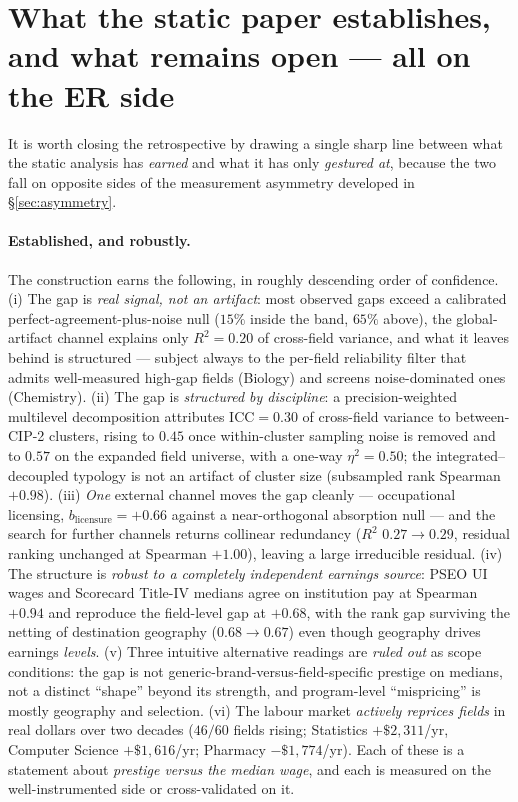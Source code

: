 \documentclass[11pt]{article}
\begin{document}
\section{What the static paper establishes, and what remains open --- all on the ER side}\label{sec:closing}

It is worth closing the retrospective by drawing a single sharp line between what the static analysis has
\emph{earned} and what it has only \emph{gestured at}, because the two fall on opposite sides of the
measurement asymmetry developed in \S\ref{sec:asymmetry}.

\paragraph{Established, and robustly.} The construction earns the following, in roughly descending order of
confidence. (i) The gap is \emph{real signal, not an artifact}: most observed gaps exceed a calibrated
perfect-agreement-plus-noise null ($15\%$ inside the band, $65\%$ above), the global-artifact channel explains
only $R^2=0.20$ of cross-field variance, and what it leaves behind is structured --- subject always to the
per-field reliability filter that admits well-measured high-gap fields (Biology) and screens noise-dominated
ones (Chemistry). (ii) The gap is \emph{structured by discipline}: a precision-weighted multilevel
decomposition attributes $\mathrm{ICC}=0.30$ of cross-field variance to between-CIP-2 clusters, rising to $0.45$
once within-cluster sampling noise is removed and to $0.57$ on the expanded field universe, with a one-way
$\eta^2=0.50$; the integrated--decoupled typology is not an artifact of cluster size (subsampled rank Spearman
$+0.98$). (iii) \emph{One} external channel moves the gap cleanly --- occupational licensing,
$b_{\text{licensure}}=+0.66$ against a near-orthogonal absorption null --- and the search for further channels
returns collinear redundancy ($R^2$ $0.27\!\to\!0.29$, residual ranking unchanged at Spearman $+1.00$), leaving
a large irreducible residual. (iv) The structure is \emph{robust to a completely independent earnings source}:
PSEO UI wages and Scorecard Title-IV medians agree on institution pay at Spearman $+0.94$ and reproduce the
field-level gap at $+0.68$, with the rank gap surviving the netting of destination geography ($0.68\!\to\!0.67$)
even though geography drives earnings \emph{levels}. (v) Three intuitive alternative readings are \emph{ruled
out} as scope conditions: the gap is not generic-brand-versus-field-specific prestige on medians, not a distinct
``shape'' beyond its strength, and program-level ``mispricing'' is mostly geography and selection. (vi) The
labour market \emph{actively reprices fields} in real dollars over two decades ($46/60$ fields rising;
Statistics $+\$2{,}311$/yr, Computer Science $+\$1{,}616$/yr; Pharmacy $-\$1{,}774$/yr). Each of these is a
statement about \emph{prestige versus the median wage}, and each is measured on the well-instrumented side or
cross-validated on it.
\end{document}
